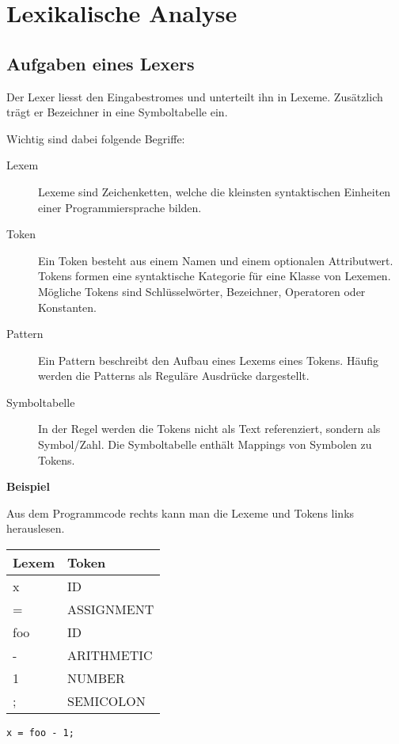 \section{Lexikalische Analyse}


\subsection{Aufgaben eines Lexers}

Der Lexer liesst den Eingabestromes und unterteilt ihn in Lexeme. Zusätzlich
trägt er Bezeichner in eine Symboltabelle ein.

Wichtig sind dabei folgende Begriffe:

\begin{description}
	\item[Lexem] Lexeme sind Zeichenketten, welche die kleinsten syntaktischen
		Einheiten einer Programmiersprache bilden.
	\item[Token] Ein Token besteht aus einem Namen und einem optionalen
		Attributwert. Tokens formen eine syntaktische Kategorie für eine Klasse von
		Lexemen. Mögliche Tokens sind Schlüsselwörter, Bezeichner, Operatoren oder
		Konstanten.
	\item[Pattern] Ein Pattern beschreibt den Aufbau eines Lexems eines Tokens.
		Häufig werden die Patterns als Reguläre Ausdrücke dargestellt.
	\item[Symboltabelle] In der Regel werden die Tokens nicht als Text
		referenziert, sondern als Symbol/Zahl. Die Symboltabelle enthält Mappings
		von Symbolen zu Tokens.
\end{description}

\textbf{Beispiel}

Aus dem Programmcode rechts kann man die Lexeme und Tokens links
herauslesen.

\begin{minipage}{.4\linewidth}
	\begin{tabular}[h]{|l|l|}
		\hline
		\textbf{Lexem} & \textbf{Token} \\
		\hline
		x & ID \\
		= & ASSIGNMENT \\
		foo & ID \\
		- & ARITHMETIC \\
		1 & NUMBER \\
		; & SEMICOLON \\
		\hline
	\end{tabular}
\end{minipage}
\begin{minipage}{.6\linewidth}
	\large\texttt{x = foo - 1;}
\end{minipage}


